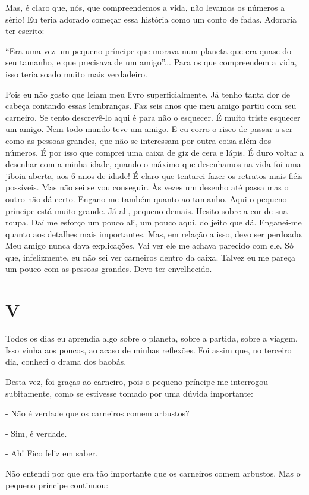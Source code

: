 Mas, é claro que, nós, que compreendemos a vida, não levamos os números
a sério! Eu teria adorado começar essa história como um conto de fadas.
Adoraria ter escrito:

``Era uma vez um pequeno príncipe que morava num planeta que era quase
do seu tamanho, e que precisava de um amigo''... Para os que compreendem
a vida, isso teria soado muito mais verdadeiro.

Pois eu não gosto que leiam meu livro superficialmente. Já tenho tanta
dor de cabeça contando essas lembranças. Faz seis anos que meu amigo
partiu com seu carneiro. Se tento descrevê-lo aqui é para não o
esquecer. É muito triste esquecer um amigo. Nem todo mundo teve um
amigo. E eu corro o risco de passar a ser como as pessoas grandes, que
não se interessam por outra coisa além dos números. É por isso que
comprei uma caixa de giz de cera e lápis. É duro voltar a desenhar com a
minha idade, quando o máximo que desenhamos na vida foi uma jiboia
aberta, aos 6 anos de idade! É claro que tentarei fazer os retratos mais
fiéis possíveis. Mas não sei se vou conseguir. Às vezes um desenho até
passa mas o outro não dá certo. Engano-me também quanto ao tamanho. Aqui
o pequeno príncipe está muito grande. Já ali, pequeno demais. Hesito
sobre a cor de sua roupa. Daí me esforço um pouco ali, um pouco aqui, do
jeito que dá. Enganei-me quanto aos detalhes mais importantes. Mas, em
relação a isso, devo ser perdoado. Meu amigo nunca dava explicações. Vai
ver ele me achava parecido com ele. Só que, infelizmente, eu não sei ver
carneiros dentro da caixa. Talvez eu me pareça um pouco com as pessoas
grandes. Devo ter envelhecido.

\chapter{V}

Todos os dias eu aprendia algo sobre o planeta, sobre a partida, sobre a
viagem. Isso vinha aos poucos, ao acaso de minhas reflexões. Foi assim
que, no terceiro dia, conheci o drama dos baobás.

Desta vez, foi graças ao carneiro, pois o pequeno príncipe me interrogou
subitamente, como se estivesse tomado por uma dúvida importante:

- Não é verdade que os carneiros comem arbustos?

- Sim, é verdade.

- Ah! Fico feliz em saber.

Não entendi por que era tão importante que os carneiros comem arbustos.
Mas o pequeno príncipe continuou:

